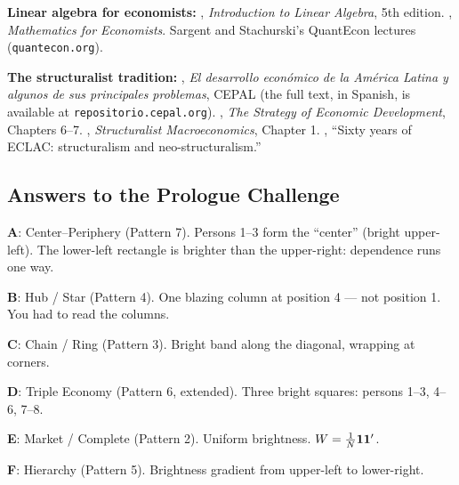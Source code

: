 \documentclass[../structural_economics_book.tex]{subfiles}
\begin{document}
\textbf{Linear algebra for economists:} \citet{strang2016introduction}, \textit{Introduction to Linear Algebra}, 5th edition. \citet{simon1994mathematics}, \textit{Mathematics for Economists}. Sargent and Stachurski's QuantEcon lectures (\texttt{quantecon.org}).

\textbf{The structuralist tradition:} \citet{prebisch1949desarrollo}, \textit{El desarrollo econ\'{o}mico de la Am\'{e}rica Latina y algunos de sus principales problemas}, CEPAL (the full text, in Spanish, is available at \texttt{repositorio.cepal.org}). \citet{hirschman1958strategy}, \textit{The Strategy of Economic Development}, Chapters 6--7. \citet{taylor1983structuralist}, \textit{Structuralist Macroeconomics}, Chapter 1. \citet{bielschowsky2009sixty}, ``Sixty years of ECLAC: structuralism and neo-structuralism.''


\subsection*{Answers to the Prologue Challenge}

\textbf{A}: Center--Periphery (Pattern 7). Persons 1--3 form the ``center'' (bright upper-left). The lower-left rectangle is brighter than the upper-right: dependence runs one way.

\textbf{B}: Hub / Star (Pattern 4). One blazing column at position 4 --- not position 1. You had to read the columns.

\textbf{C}: Chain / Ring (Pattern 3). Bright band along the diagonal, wrapping at corners.

\textbf{D}: Triple Economy (Pattern 6, extended). Three bright squares: persons 1--3, 4--6, 7--8.

\textbf{E}: Market / Complete (Pattern 2). Uniform brightness. $W = \frac{1}{N}\mathbf{1}\mathbf{1}'$.

\textbf{F}: Hierarchy (Pattern 5). Brightness gradient from upper-left to lower-right.
\end{document}
